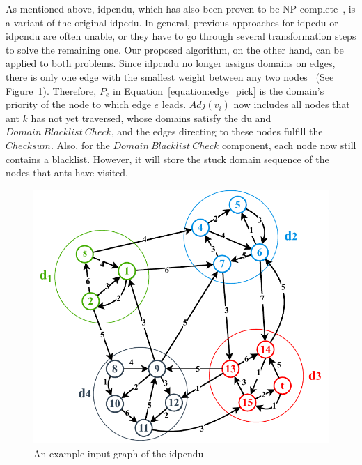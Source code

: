 As mentioned above, \acrshort{idpcndu}, which has also been proven to be NP-complete~\cite{maggi2018domain}, is a variant of the original \gls{idpcdu}. In general, previous approaches for \gls{idpcdu} or \acrshort{idpcndu} are often unable, or they have to go through several transformation steps to solve the remaining one. Our proposed algorithm, on the other hand, can be applied to both problems. Since \acrshort{idpcndu} no longer assigns domains on edges, there is only one edge with the smallest weight between any two nodes~\cite{binh2021two} (See Figure~\ref{fig:idpc-ndu-example}). Therefore, $P_e$ in Equation~\ref{equation:edge_pick} is the domain's priority of the node to which edge $e$ leads. $Adj(v_i)$ now includes all nodes that ant $k$ has not yet traversed, whose domains satisfy the \gls{du} and $Domain~Blacklist~Check$, and the edges directing to these nodes fulfill the $Checksum$.
Also, for the $Domain~Blacklist~Check$ component, each node now still contains a blacklist. However, it will store the stuck domain sequence of the nodes that ants have visited.
\bigskip
\setlength{\intextsep}{3pt}
\renewcommand{\scalefigure}{.9}
\begin{figure}[htbp]
	\centering
	\includegraphics[scale=\scalefigure]{Figures/chap 3/IDPC-NDU.pdf}
	\caption{An example input graph of the \gls{idpcndu}}
	\label{fig:idpc-ndu-example}
\end{figure}